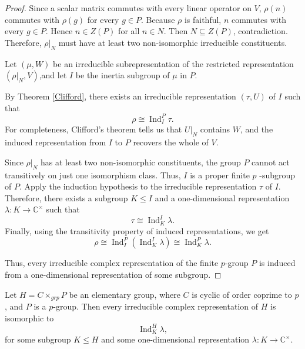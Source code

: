 \begin{proof}
Since a scalar matrix commutes with every linear operator on \(V\),  \(\rho(n)\) commutes with \(\rho(g)\) for every \(g \in P\). Because \(\rho\) is faithful, \(n\) commutes with every \(g \in P\). Hence \(n \in Z(P)\) for all \(n \in N\). Then \(N \subseteq Z(P)\), contradiction.
Therefore, \(\rho|_N\) must have at least two non-isomorphic irreducible constituents.


Let $(\mu, W )$ be an irreducible subrepresentation of the restricted representation
$(\rho|_N , V )$,and let $I$ be the inertia subgroup of \(\mu\) in \(P\).


By Theorem \ref{Clifford}, there exists an irreducible representation \((\tau,U)\) of \(I\) such that
\[
\rho \cong \operatorname{Ind}_{I}^{P} \tau.
\]
For completeness, Clifford's theorem tells us that \(U|_N\) contains \(W\), and the induced representation from \(I\) to \(P\) recovers the whole of \(V\).

Since \(\rho|_N\) has at least two non-isomorphic constituents, the group \(P\) cannot act transitively on just one isomorphism class. Thus, \(I\) is a proper finite \(p\) -subgroup of \(P\). Apply the induction hypothesis to the irreducible representation \(\tau\) of \(I\). Therefore, there exists a subgroup \(K \leq I\) and a one-dimensional representation \(\lambda : K \to \mathbb{C}^{\times}\) such that
\[
\tau \cong \operatorname{Ind}_{K}^{I} \lambda.
\]
Finally, using the transitivity property of induced representations, we get
\[
\rho \cong \operatorname{Ind}_{I}^{P} \left( \operatorname{Ind}_{K}^{I} \lambda \right)
\cong \operatorname{Ind}_{K}^{P} \lambda.
\]

Thus, every irreducible complex representation of the finite \(p\)-group \(P\) is induced from a one-dimensional representation of some subgroup. 
\end{proof}

\begin{prop}\label{prop:elem_1_dim}
Let \(H = C \times_{grp} P\) be an elementary group, where \(C\) is cyclic of order coprime to \(p\), and \(P\) is a \(p\)-group. Then every irreducible complex representation of \(H\) is isomorphic to
\[
\operatorname{Ind}_{K}^{H} \lambda,
\]
for some subgroup \(K \le H\) and some one-dimensional representation \(\lambda: K \to \mathbb{C}^{\times}\).
\end{prop}


